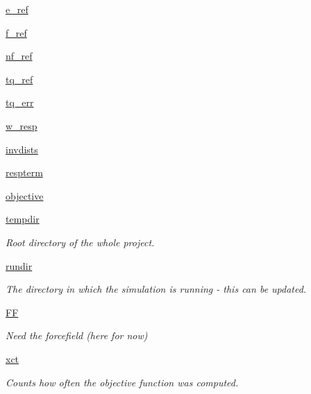 \begin{DoxyCompactItemize}
\hyperlink{classforcebalance_1_1abinitio_1_1AbInitio_a0fa6ba3ce272657e4f284267b35574ad}{e\-\_\-ref}
\item 
\hyperlink{classforcebalance_1_1abinitio_1_1AbInitio_a945a7463f68474234fa8fdfe93888ff1}{f\-\_\-ref}
\item 
\hyperlink{classforcebalance_1_1abinitio_1_1AbInitio_ad83ddb614190a3c3e647060ce3e063ad}{nf\-\_\-ref}
\item 
\hyperlink{classforcebalance_1_1abinitio_1_1AbInitio_a35ffa4510b557dd4fbce2cd8276fa09b}{tq\-\_\-ref}
\item 
\hyperlink{classforcebalance_1_1abinitio_1_1AbInitio_a36857e469f48d8bddbd3b288a92cac10}{tq\-\_\-err}
\item 
\hyperlink{classforcebalance_1_1abinitio_1_1AbInitio_ab949767e48e84f747f0e84c304d80004}{w\-\_\-resp}
\item 
\hyperlink{classforcebalance_1_1abinitio_1_1AbInitio_ac90a96916a049717e14bc1f757577f24}{invdists}
\item 
\hyperlink{classforcebalance_1_1abinitio_1_1AbInitio_ac4f8e85daeccb2e46b724eddc76d38e1}{respterm}
\item 
\hyperlink{classforcebalance_1_1abinitio_1_1AbInitio_ae27974d01fbc7d485ce3e049a54943bc}{objective}
\item 
\hyperlink{classforcebalance_1_1target_1_1Target_aede2856573b890cd47054ad36937d6f6}{tempdir}
\begin{DoxyCompactList}\small\item\em \-Root directory of the whole project. \end{DoxyCompactList}\item 
\hyperlink{classforcebalance_1_1target_1_1Target_a1da470037ef61c22dc44beb85cfa01a9}{rundir}
\begin{DoxyCompactList}\small\item\em \-The directory in which the simulation is running -\/ this can be updated. \end{DoxyCompactList}\item 
\hyperlink{classforcebalance_1_1target_1_1Target_a796dc30a19a60c63fb43b088d40a963f}{\-F\-F}
\begin{DoxyCompactList}\small\item\em \-Need the forcefield (here for now) \end{DoxyCompactList}\item 
\hyperlink{classforcebalance_1_1target_1_1Target_ad4cd0ab38d8fc97d3e7a6e22ce130a16}{xct}
\begin{DoxyCompactList}\small\item\em \-Counts how often the objective function was computed. \end{DoxyCompactList}\item 

\end{DoxyCompactItemize}
